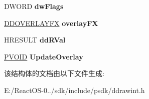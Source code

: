 \begin{DoxyCompactItemize}
D\+W\+O\+RD {\bfseries dw\+Flags}
\item 
\mbox{\label{struct___d_d___u_p_d_a_t_e_o_v_e_r_l_a_y_d_a_t_a_a3d9c7f22e7a3e69c35cf5ea1137797e4}} 
\hyperlink{struct___d_d_o_v_e_r_l_a_y_f_x}{D\+D\+O\+V\+E\+R\+L\+A\+Y\+FX} {\bfseries overlay\+FX}
\item 
\mbox{\label{struct___d_d___u_p_d_a_t_e_o_v_e_r_l_a_y_d_a_t_a_ab4f400bf0a38f394748342f519082f18}} 
H\+R\+E\+S\+U\+LT {\bfseries dd\+R\+Val}
\item 
\mbox{\label{struct___d_d___u_p_d_a_t_e_o_v_e_r_l_a_y_d_a_t_a_a42daa5915b5c171690cc573c7a088c23}} 
\hyperlink{interfacevoid}{P\+V\+O\+ID} {\bfseries Update\+Overlay}
\end{DoxyCompactItemize}


该结构体的文档由以下文件生成\+:\begin{DoxyCompactItemize}
\item 
E\+:/\+React\+O\+S-\/0../sdk/include/psdk/ddrawint.\+h\end{DoxyCompactItemize}
